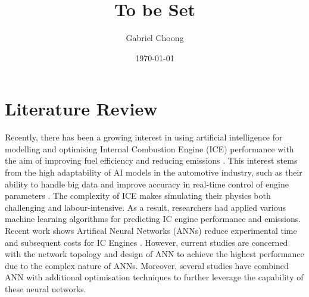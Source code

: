 \documentclass[a4paper, 12pt]{article}
\title{To be Set}
\author{Gabriel Choong}
\date{\today}
\begin{document}
\maketitle



\section{Literature Review}
Recently, there has been a growing interest in using artificial intelligence for modelling and optimising Internal Combustion Engine (ICE) performance with the aim of improving fuel efficiency and reducing emissions \parencite{karunamurthyPredictionICEngine2023}. This interest stems from the high adaptability of AI models in the automotive industry, such as their ability to handle big data and improve accuracy in real-time control of engine parameters \parencite{inezahavugimanaReviewArtificialIntelligent2023}. The complexity of ICE makes simulating their physics both challenging and labour-intensive. As a result, researchers had applied various machine learning algorithms for predicting IC engine performance and emissions. Recent work shows Artifical Neural Networks (ANNs) reduce experimental time and subsequent costs for IC Engines \parencite{bhattApplicationArtificialNeural2022, tuanhoangReviewApplicationArtificial2021}. However, current studies are concerned with the network topology and design of ANN to achieve the highest performance due to the complex nature of ANNs. Moreover, several studies have combined ANN with additional optimisation techniques to further leverage the capability of these neural networks. \\
\end{document}
